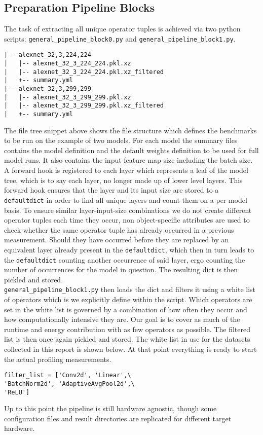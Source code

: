 \documentclass[conference]{IEEEtran}
\begin{document}
\subsection{Preparation Pipeline Blocks}
The task of extracting all unique operator tuples is achieved via two python scripts:  \texttt{general\_pipeline\_block0.py} and \texttt{general\_pipeline\_block1.py}. \\
\begin{verbatim}
|-- alexnet_32,3,224,224
|   |-- alexnet_32_3_224_224.pkl.xz
|   |-- alexnet_32_3_224_224.pkl.xz_filtered
|   +-- summary.yml
|-- alexnet_32,3,299,299
|   |-- alexnet_32_3_299_299.pkl.xz
|   |-- alexnet_32_3_299_299.pkl.xz_filtered
|   +-- summary.yml
\end{verbatim}
The file tree snippet above shows the file structure which defines the benchmarks to be run on the example of two models. For each model the summary files contains the model definition and the default weights definition to be used for full model runs. It also contains the input feature map size including the batch size.
A forward hook is registered to each layer which represents a leaf of the model tree, which is to say each layer, no longer made up of lower level layers. This forward hook ensures that the layer and its input size are stored to a \texttt{defaultdict} in order to find all unique layers and count them on a per model basis. To ensure similar layer-input-size combinations we do not create different operator tuples each time they occur, non object-specific attributes are used to check whether the same operator tuple has already occurred in a previous measurement. Should they have occurred before they are replaced by an equivalent layer already present in the \texttt{defaultdict}, which then in turn leads to the \texttt{defaultdict} counting another occurrence of said layer, ergo counting the number of occurrences for the model in question. The resulting dict is then pickled and stored. \\
\texttt{general\_pipeline\_block1.py} then loads the dict and filters it using a white list of operators which is we explicitly define within the script. Which operators are set in the white list is governed by a combination of how often they occur and how computationally intensive they are. Our goal is to cover as much of the runtime and energy contribution with as few operators as possible. The filtered list is then once again pickled and stored. The white list in use for the datasets collected in this report is shown below. At that point everything is ready to start the actual profiling measurements.
\begin{verbatim}
filter_list = ['Conv2d', 'Linear',\
'BatchNorm2d', 'AdaptiveAvgPool2d',\
'ReLU']
\end{verbatim}
Up to this point the pipeline is still hardware agnostic, though some configuration files and result directories are replicated for different target hardware.
\end{document}
